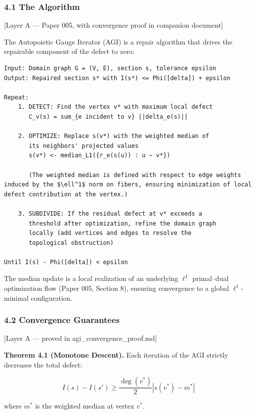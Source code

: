 \documentclass[
]{article}
\begin{document}
\subsubsection{4.1 The Algorithm}\label{the-algorithm}

{[}Layer A --- Paper 005, with convergence proof in companion
document{]}

The Autopoietic Gauge Iterator (AGI) is a repair algorithm that drives
the repairable component of the defect to zero:

\begin{verbatim}
Input: Domain graph G = (V, E), section s, tolerance epsilon
Output: Repaired section s* with I(s*) <= Phi([delta]) + epsilon

Repeat:
    1. DETECT: Find the vertex v* with maximum local defect
       C_v(s) = sum_{e incident to v} ||delta_e(s)||

    2. OPTIMIZE: Replace s(v*) with the weighted median of
       its neighbors' projected values
       s(v*) <- median_L1({r_e(s(u)) : u ~ v*})

       (The weighted median is defined with respect to edge weights induced by the $\ell^1$ norm on fibers, ensuring minimization of local defect contribution at the vertex.)

    3. SUBDIVIDE: If the residual defect at v* exceeds a
       threshold after optimization, refine the domain graph
       locally (add vertices and edges to resolve the
       topological obstruction)

Until I(s) - Phi([delta]) < epsilon
\end{verbatim}

The median update is a local realization of an underlying \(\ell^1\)
primal--dual optimization flow (Paper 005, Section 8), ensuring
convergence to a global \(\ell^1\)-minimal configuration.

\subsubsection{4.2 Convergence Guarantees}\label{convergence-guarantees}

{[}Layer A --- proved in agi\_convergence\_proof.md{]}

\textbf{Theorem 4.1 (Monotone Descent).} Each iteration of the AGI
strictly decreases the total defect:

\[I(s) - I(s') \geq \frac{\deg(v^*)}{2} |s(v^*) - m^*|\]

where \(m^*\) is the weighted median at vertex \(v^*\).
\end{document}
